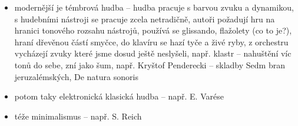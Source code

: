 \documentclass{article}
\begin{document}
\begin{itemize}
  \item modernější je témbrová hudba -- hudba pracuje s barvou zvuku a dynamikou, s hudebními nástroji se pracuje zcela netradičně, autoři požadují hru na hranici tonového rozsahu nástrojů, používá se glissando, flažolety (co to je?), hraní dřevěnou částí smyčce, do klavíru se hazí tyče a živé ryby, z orchestru vycházejí zvuky které jsme dosud ještě neslyšeli, např. klastr -- nahuštění víc tonů do sebe, zní jako šum, např. Kryštof Penderecki -- skladby Sedm bran jeruzalémských, De natura sonoris
  \item potom taky elektronická klasická hudba -- např. E. Varése
  \item téže minimalismus -- např. S. Reich
\end{itemize}
\end{document}
